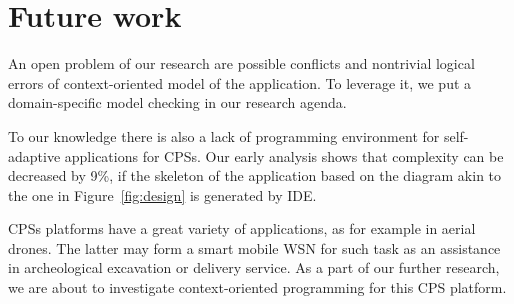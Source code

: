 \section{Future work}

An open problem of our research are possible conflicts and nontrivial
logical errors of context-oriented model of the application. To leverage it, we
put a domain-specific model checking in our research agenda.

To our knowledge there is also a lack of programming environment for
self-adaptive applications for CPSs. Our early analysis shows that complexity
can be decreased by 9\%, if the skeleton of the application based on the diagram
akin to the one in Figure~\ref{fig:design} is generated by IDE.

CPSs platforms have a great variety of applications, as for example in aerial
drones. The latter may form a smart mobile WSN for such task as an assistance in
archeological excavation or delivery service. As a part of our further research,
we are about to investigate context-oriented programming for this CPS platform.
